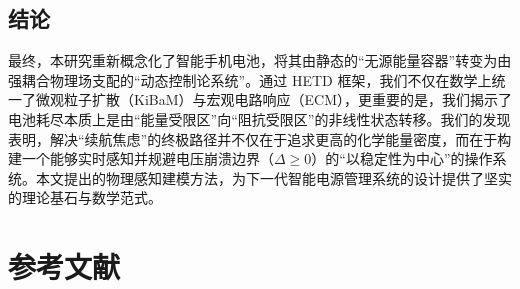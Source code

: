 \documentclass[11pt,a4paper]{ctexart}
\begin{document}
\subsection{结论}

最终，本研究重新概念化了智能手机电池，将其由静态的“无源能量容器”转变为由强耦合物理场支配的“动态控制论系统”。通过 HETD 框架，我们不仅在数学上统一了微观粒子扩散（KiBaM）与宏观电路响应（ECM），更重要的是，我们揭示了电池耗尽本质上是由“能量受限区”向“阻抗受限区”的非线性状态转移。我们的发现表明，解决“续航焦虑”的终极路径并不仅在于追求更高的化学能量密度，而在于构建一个能够实时感知并规避电压崩溃边界（$\Delta \ge 0$）的“以稳定性为中心”的操作系统。本文提出的物理感知建模方法，为下一代智能电源管理系统的设计提供了坚实的理论基石与数学范式。

\section*{参考文献}
\end{document}
